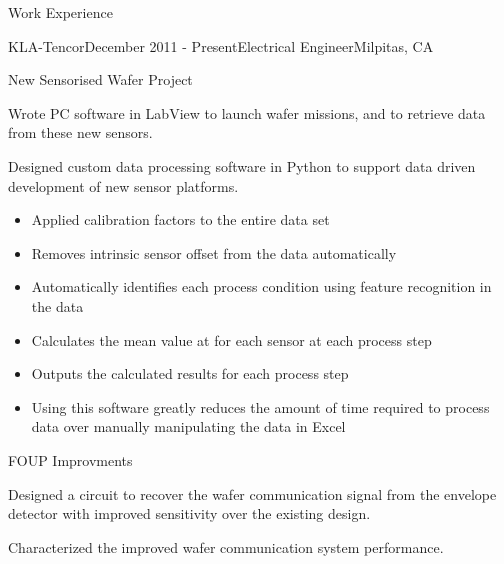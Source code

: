 \documentclass{resume} %
\begin{document}
\begin{rSection}{Work Experience}
\begin{rSubsection}{KLA-Tencor}{December 2011 - Present}{Electrical Engineer}{Milpitas, CA}
\begin{rWorkProject}{New Sensorised Wafer Project}
\item Wrote PC software in LabView to launch wafer missions, and to retrieve data from these new sensors.
\item Designed custom data processing software in Python to support data driven development of new sensor platforms.
\begin{itemize}
\itemsep -0.5em \vspace{-0.5em}
\renewcommand{\labelitemi}{-}
\item Applied calibration factors to the entire data set
\item Removes intrinsic sensor offset from the data automatically
\item Automatically identifies each process condition using feature recognition in the data
\item Calculates the mean value at for each sensor at each process step
\item Outputs the calculated results for each process step
\item Using this software greatly reduces the amount of time required to process data over manually manipulating the data in Excel
\end{itemize}
\end{rWorkProject}


\begin{rWorkProject}{FOUP Improvments}
\item Designed a circuit to recover the wafer communication signal from the envelope detector with improved sensitivity over the existing design.
\item Characterized the improved wafer communication system performance.
\end{rWorkProject}

\end{rSubsection}



\end{rSection}
\end{document}
